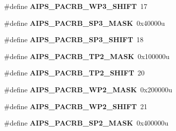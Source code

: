 \begin{DoxyCompactItemize}
\item 
\#define {\bfseries A\+I\+P\+S\+\_\+\+P\+A\+C\+R\+B\+\_\+\+W\+P3\+\_\+\+S\+H\+I\+FT}~17\hypertarget{group__AIPS__Register__Masks_ga48628fc7b9d35d0a10321d641c0e2f84}{}\label{group__AIPS__Register__Masks_ga48628fc7b9d35d0a10321d641c0e2f84}

\item 
\#define {\bfseries A\+I\+P\+S\+\_\+\+P\+A\+C\+R\+B\+\_\+\+S\+P3\+\_\+\+M\+A\+SK}~0x40000u\hypertarget{group__AIPS__Register__Masks_ga52e9a807ad467d5ced9f0b30a6c3cbed}{}\label{group__AIPS__Register__Masks_ga52e9a807ad467d5ced9f0b30a6c3cbed}

\item 
\#define {\bfseries A\+I\+P\+S\+\_\+\+P\+A\+C\+R\+B\+\_\+\+S\+P3\+\_\+\+S\+H\+I\+FT}~18\hypertarget{group__AIPS__Register__Masks_ga5557b7b1fda13987a1539ddb5f7ac6e5}{}\label{group__AIPS__Register__Masks_ga5557b7b1fda13987a1539ddb5f7ac6e5}

\item 
\#define {\bfseries A\+I\+P\+S\+\_\+\+P\+A\+C\+R\+B\+\_\+\+T\+P2\+\_\+\+M\+A\+SK}~0x100000u\hypertarget{group__AIPS__Register__Masks_ga739172b56d496c92a6fcfe1983ba0d8e}{}\label{group__AIPS__Register__Masks_ga739172b56d496c92a6fcfe1983ba0d8e}

\item 
\#define {\bfseries A\+I\+P\+S\+\_\+\+P\+A\+C\+R\+B\+\_\+\+T\+P2\+\_\+\+S\+H\+I\+FT}~20\hypertarget{group__AIPS__Register__Masks_gaa95aa4eedb53746b3cc3b185e298649c}{}\label{group__AIPS__Register__Masks_gaa95aa4eedb53746b3cc3b185e298649c}

\item 
\#define {\bfseries A\+I\+P\+S\+\_\+\+P\+A\+C\+R\+B\+\_\+\+W\+P2\+\_\+\+M\+A\+SK}~0x200000u\hypertarget{group__AIPS__Register__Masks_ga4c17554adc28ff0105b7aad16ccde0dd}{}\label{group__AIPS__Register__Masks_ga4c17554adc28ff0105b7aad16ccde0dd}

\item 
\#define {\bfseries A\+I\+P\+S\+\_\+\+P\+A\+C\+R\+B\+\_\+\+W\+P2\+\_\+\+S\+H\+I\+FT}~21\hypertarget{group__AIPS__Register__Masks_gad7234229e79e3e2a5366e9d907a51e0b}{}\label{group__AIPS__Register__Masks_gad7234229e79e3e2a5366e9d907a51e0b}

\item 
\#define {\bfseries A\+I\+P\+S\+\_\+\+P\+A\+C\+R\+B\+\_\+\+S\+P2\+\_\+\+M\+A\+SK}~0x400000u\hypertarget{group__AIPS__Register__Masks_gac008650adc25885669aa84cf83ea116e}{}\label{group__AIPS__Register__Masks_gac008650adc25885669aa84cf83ea116e}


\end{DoxyCompactItemize}
